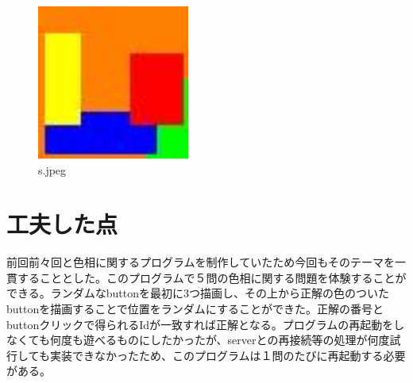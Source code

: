 \documentclass[dvipdfmx]{jsarticle}
\begin{document}
\section{}
\begin{figure}
  \centering
  \includegraphics[width=5cm]{s.jpeg}
  \caption{s.jpeg}
\end{figure}


\section{工夫した点}
前回前々回と色相に関するプログラムを制作していたため今回もそのテーマを一貫することとした。このプログラムで５問の色相に関する問題を体験することができる。ランダムなbuttonを最初に3つ描画し、その上から正解の色のついたbuttonを描画することで位置をランダムにすることができた。正解の番号とbuttonクリックで得られるIdが一致すれば正解となる。プログラムの再起動をしなくても何度も遊べるものにしたかったが、serverとの再接続等の処理が何度試行しても実装できなかったため、このプログラムは１問のたびに再起動する必要がある。
\end{document}

